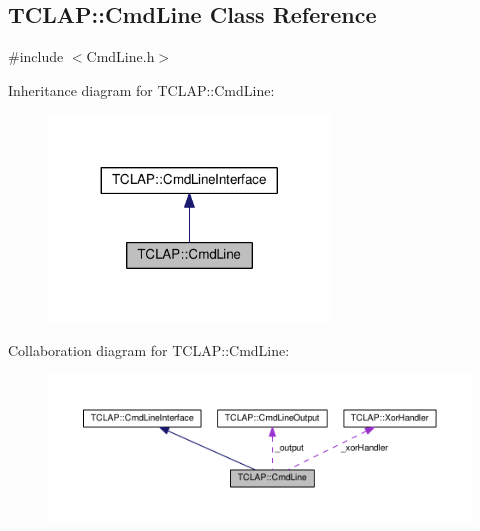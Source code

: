 \hypertarget{classTCLAP_1_1CmdLine}{}\subsection{T\+C\+L\+AP\+:\+:Cmd\+Line Class Reference}
\label{classTCLAP_1_1CmdLine}


{\ttfamily \#include $<$Cmd\+Line.\+h$>$}



Inheritance diagram for T\+C\+L\+AP\+:\+:Cmd\+Line\+:
\nopagebreak
\begin{figure}[H]
\begin{center}
\leavevmode
\includegraphics[width=212pt]{classTCLAP_1_1CmdLine__inherit__graph}
\end{center}
\end{figure}


Collaboration diagram for T\+C\+L\+AP\+:\+:Cmd\+Line\+:
\nopagebreak
\begin{figure}[H]
\begin{center}
\leavevmode
\includegraphics[width=350pt]{classTCLAP_1_1CmdLine__coll__graph}
\end{center}
\end{figure}
